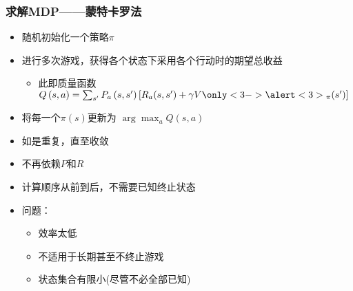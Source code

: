 \documentclass[10pt,CJK]{beamer}
\begin{document}
	\begin{frame}
		\frametitle{求解MDP——蒙特卡罗法}
		\begin{itemize}
			\item 随机初始化一个策略$\pi$\pause
			\item 进行多次游戏，获得各个状态下采用各个行动时的期望总收益
			\begin{itemize}
				\item 此即\alert<2>{质量函数}\\
				$Q\left(s,a\right)=
				\sum_{s'}P_{a}\left(s,s'\right)\left[
				R_{a}(s,s')+\gamma V\only<3->{\alert<3>{_\pi}}(s')
				\right]$
			\end{itemize}\pause\pause
			\item 将每一个$\pi\left(s\right)$更新为
			$\arg\max_{a}Q\left(s,a\right)$\pause
			\item 如是重复，直至收敛\pause
			\item 不再依赖$P$和$R$\pause
			\item 计算顺序从前到后，不需要已知终止状态\pause
			\item 问题：
			\begin{itemize}
				\item 效率太低
				\item 不适用于长期甚至不终止游戏
				\item 状态集合有限小(尽管不必全部已知)
			\end{itemize}
		\end{itemize}
	\end{frame}
	
\end{document}
